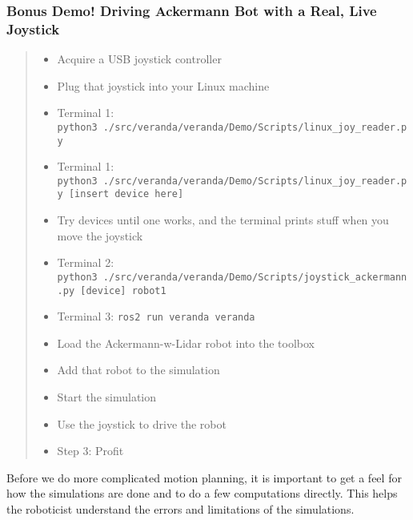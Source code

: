 \hypertarget{bonus-demo-driving-ackermann-bot-with-a-real-live-joystick}{%
\subsubsection{Bonus Demo! Driving Ackermann Bot with a Real, Live
Joystick}\label{bonus-demo-driving-ackermann-bot-with-a-real-live-joystick}}

\begin{quote}
\begin{itemize}
\tightlist
\item
  Acquire a USB joystick controller
\item
  Plug that joystick into your Linux machine
\item
  Terminal 1:
  \texttt{python3\ ./src/veranda/veranda/Demo/Scripts/linux\_joy\_reader.py}
\item
  Terminal 1:
  \texttt{python3\ ./src/veranda/veranda/Demo/Scripts/linux\_joy\_reader.py\ {[}insert\ device\ here{]}}
\item
  Try devices until one works, and the terminal prints stuff when you
  move the joystick
\item
  Terminal 2:
  \texttt{python3\ ./src/veranda/veranda/Demo/Scripts/joystick\_ackermann.py\ {[}device{]}\ robot1}
\item
  Terminal 3: \texttt{ros2\ run\ veranda\ veranda}
\item
  Load the Ackermann-w-Lidar robot into the toolbox
\item
  Add that robot to the simulation
\item
  Start the simulation
\item
  Use the joystick to drive the robot
\item
  Step 3: Profit
\end{itemize}
\end{quote}

Before we do more complicated motion planning, it is important to get a
feel for how the simulations are done and to do a few computations
directly. This helps the roboticist understand the errors and
limitations of the simulations.
